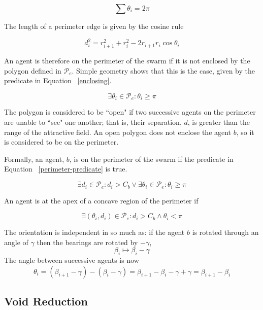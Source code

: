\documentclass[letterpaper]{article}
\begin{document}
\begin{equation}
	\sum\theta_i = 2\pi
\end{equation}

The length of a perimeter edge is given by the cosine rule

\begin{equation}
	d_i^2 = r_{i+1}^2 + r_i^2 -2r_{i+1}r_i \cos\theta_i
\end{equation}

An agent is therefore on the perimeter of the swarm if it is not enclosed by the polygon defined in $\mathcal{P}_e$.  Simple geometry shows that this is the case, given by the predicate in Equation ~\ref{enclosing}.

\begin{equation}
	\exists \theta_i \in \mathcal{P}_e : \theta_i\geq\pi
	\label{enclosing}
\end{equation}

The polygon is considered to be ``open" if two successive agents on the perimeter are unable to ``see" one another; that is, their separation, $d$, is greater than the range of the attractive field.  An open polygon does not enclose the agent $b$, so it is considered to be on the perimeter. 

Formally, an agent, $b$, is on the perimeter of the swarm if the predicate in Equation ~\ref{perimeter-predicate} is true.

\begin{equation}
	\exists d_i\in\mathcal{P}_e:d_i>C_b \vee
	\exists\theta_i\in\mathcal{P}_e:\theta_i\geq\pi
	\label{perimeter-predicate}
\end{equation}

An agent is at the apex of a concave region of the perimeter if

\begin{equation}
	\exists(\theta_i,d_i)\in\mathcal{P}_e : d_i>C_b\wedge\theta_i<\pi
	\label{concave-predicate}
\end{equation}

The orientation is independent in so much as: if the agent $b$ is rotated through an angle of $\gamma$ then the bearings are rotated by $-\gamma$, \[ \beta_i\mapsto\beta_i-\gamma \] The  angle between successive agents is now
\[
	\theta_i  =  (\beta_{i+1}-\gamma) - (\beta_i-\gamma)
	 = \beta_{i+1}-\beta_i-\gamma+\gamma
	 = \beta_{i+1}-\beta_i
\]

\subsection{Void Reduction}
\end{document}
